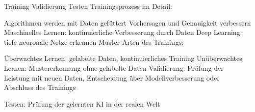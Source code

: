 \documentclass{article}
\begin{document}
\vspace{2mm}Training
Validierung
Testen
Trainingsprozess im Detail:

\vspace{2mm}Algorithmen werden mit Daten gefüttert
Vorhersagen und Genauigkeit verbessern
Maschinelles Lernen: kontinuierliche Verbesserung durch Daten
Deep Learning: tiefe neuronale Netze erkennen Muster
Arten des Trainings:

\vspace{2mm}Überwachtes Lernen: gelabelte Daten, kontinuierliches Training
Unüberwachtes Lernen: Mustererkennung ohne gelabelte Daten
Validierung: Prüfung der Leistung mit neuen Daten, Entscheidung über Modellverbesserung oder Abschluss des Trainings

\vspace{2mm}Testen: Prüfung der gelernten KI in der realen Welt




\printbibliography
\end{document}
